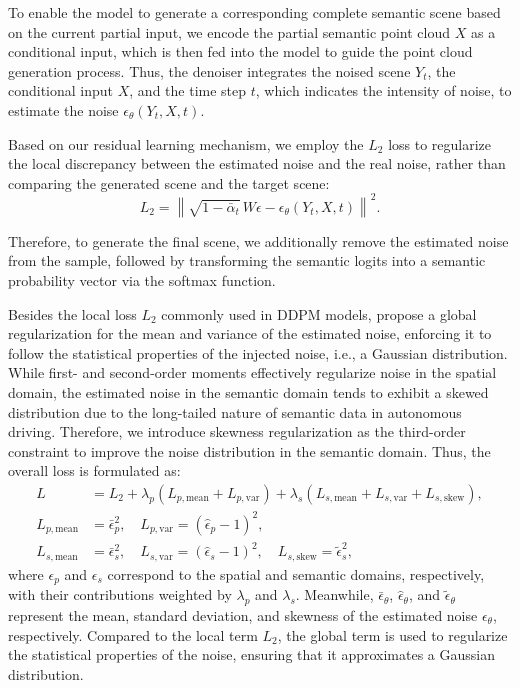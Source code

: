 \documentclass[conference]{IEEEtran}
\begin{document}
To enable the model to generate a corresponding complete semantic scene based on the current partial input, we encode the partial semantic point cloud $X$ as a conditional input, which is then fed into the model to guide the point cloud generation process.
Thus, the denoiser integrates the noised scene $Y_t$, the conditional input $X$, and the time step $t$, which indicates the intensity of noise, to estimate the noise $\epsilon_\theta(Y_t, X, t)$.

Based on our residual learning mechanism, we employ the $L_2$ loss to regularize the local discrepancy between the estimated noise and the real noise, rather than comparing the generated scene and the target scene:
\begin{equation}
  L_2 = \left\| \sqrt{1 - \bar{\alpha}_t}\, W\epsilon - \epsilon_\theta(Y_t, X, t) \right\|^2.
  \label{eq:l2}
\end{equation}

Therefore, to generate the final scene, we additionally remove the estimated noise from the sample, followed by transforming the semantic logits into a semantic probability vector via the softmax function.

Besides the local loss $L_2$ commonly used in DDPM models, \cite{zxia2024} propose a global regularization for the mean and variance of the estimated noise, enforcing it to follow the statistical properties of the injected noise, i.e., a Gaussian distribution.
While first- and second-order moments effectively regularize noise in the spatial domain, the estimated noise in the semantic domain tends to exhibit a skewed distribution due to the long-tailed nature of semantic data in autonomous driving.
Therefore, we introduce skewness regularization as the third-order constraint to improve the noise distribution in the semantic domain.
Thus, the overall loss is formulated as:
\begin{align}
  L &= L_2 + \lambda_p (L_{p,\mathrm{mean}} + L_{p,\mathrm{var}}) + \lambda_s (L_{s,\mathrm{mean}} + L_{s,\mathrm{var}} + L_{s,\mathrm{skew}}), \nonumber \\
  L_{p,\mathrm{mean}} &= \bar{\epsilon}_p^2, \quad L_{p,\mathrm{var}} = (\hat{\epsilon}_p - 1)^2, \nonumber \\
  L_{s,\mathrm{mean}} &= \bar{\epsilon}_s^2, \quad L_{s,\mathrm{var}} = (\hat{\epsilon}_s - 1)^2, \quad L_{s,\mathrm{skew}} = \tilde{\epsilon}_s^2,
  \label{eq:loss}
\end{align}
where $\epsilon_p$ and $\epsilon_s$ correspond to the spatial and semantic domains, respectively, with their contributions weighted by $\lambda_p$ and $\lambda_s$.
Meanwhile, $\bar{\epsilon}_\theta$, $\hat{\epsilon}_\theta$, and $\tilde{\epsilon}_\theta$ represent the mean, standard deviation, and skewness of the estimated noise $\epsilon_\theta$, respectively.
Compared to the local term $L_2$, the global term is used to regularize the statistical properties of the noise, ensuring that it approximates a Gaussian distribution.
\end{document}
